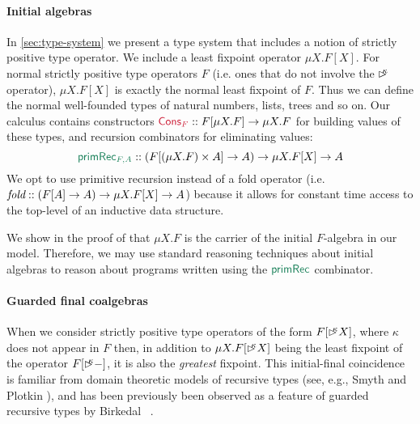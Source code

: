 \paragraph{Initial algebras}
In \autoref{sec:type-system} we present a type system that includes a
notion of strictly positive type operator. We include a least fixpoint
operator $\mu X. F[X]$. For normal strictly positive type operators
$F$ (i.e. ones that do not involve the $\mathord{\rhd\kern-0.4em^{\kappa}}$ operator), $\mu
X. F[X]$ is exactly the normal least fixpoint of $F$. Thus we can
define the normal well-founded types of natural numbers, lists, trees
and so on. Our calculus contains constructors $\cons{Cons$_F$} ::
F[\mu X. F] \to \mu X. F$ for building values of these types, and
recursion combinators for eliminating values:
\begin{displaymath}
  \elim{primRec$_{F,A}$} :: (F[(\mu X. F) \times A] \to A) \to \mu X. F[X] \to A 
\end{displaymath}
We opt to use primitive recursion instead of a fold operator
(i.e. $\textit{fold} :: (F[A] \to A) \to \mu X. F[X] \to A$) because
it allows for constant time access to the top-level of an inductive
data structure.

We show in the proof of  that $\mu X. F$
is the carrier of the initial $F$-algebra in our model. Therefore, we
may use standard reasoning techniques about initial algebras to reason
about programs written using the $\elim{primRec}$ combinator.

\paragraph{Guarded final coalgebras}
When we consider strictly positive type operators of the form
$F[\mathord{\rhd\kern-0.4em^{\kappa}} X]$, where $\kappa$ does not appear in $F$ then, in
addition to $\mu X. F[\mathord{\rhd\kern-0.4em^{\kappa}} X]$ being the least fixpoint of the
operator $F[\mathord{\rhd\kern-0.4em^{\kappa}} -]$, it is also the \emph{greatest}
fixpoint. This initial-final coincidence is familiar from domain
theoretic models of recursive types (see, e.g., Smyth and Plotkin
\cite{smyth82category}), and has been previously been observed as a
feature of guarded recursive types by Birkedal
\etal~\cite{birkedal12first}.

